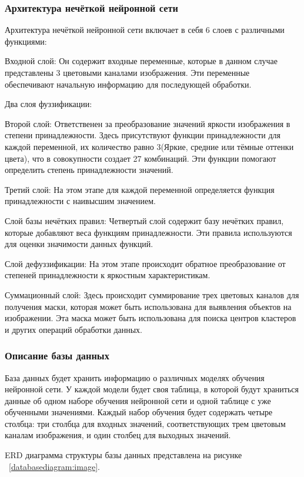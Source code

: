 \subsubsection{Архитектура нечёткой нейронной сети}

Архитектура нечёткой нейронной сети включает в себя 6 слоев с различными функциями:

Входной слой: Он содержит входные переменные, которые в данном случае представлены 3 цветовыми каналами изображения. Эти переменные обеспечивают начальную информацию для последующей обработки.

Два слоя фуззификации:

Второй слой: Ответственен за преобразование значений яркости изображения в степени принадлежности. Здесь присутствуют функции принадлежности для каждой переменной, их количество равно 3(Яркие, средние или тёмные оттенки цвета), что в совокупности создает 27 комбинаций. Эти функции помогают определить степень принадлежности значений.

Третий слой: На этом этапе для каждой переменной определяется функция принадлежности с наивысшим значением.

Слой базы нечётких правил: Четвертый слой содержит базу нечётких правил, которые добавляют веса функциям принадлежности. Эти правила используются для оценки значимости данных функций.

Слой дефуззификации: На этом этапе происходит обратное преобразование от степеней принадлежности к яркостным характеристикам.

Суммационный слой: Здесь происходит суммирование трех цветовых каналов для получения маски, которая может быть использована для выявления объектов на изображении. Эта маска может быть использована для поиска центров кластеров и других операций обработки данных.

\subsubsection{Описание базы данных}

База данных будет хранить информацию о различных моделях обучения нейронной сети. У каждой модели будет своя таблица, в которой будут храниться данные об одном наборе обучения нейронной сети и одной таблице с уже обученными значениями. Каждый набор обучения будет содержать четыре столбца: три столбца для входных значений, соответствующих трем цветовым каналам изображения, и один столбец для выходных значений.

ERD диаграмма структуры базы данных представлена на рисунке ~\ref{databasediagram:image}.

